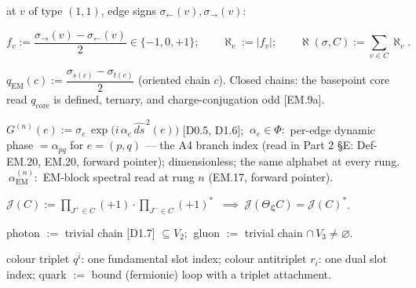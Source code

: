 \begin{definition}[{\texorpdfstring{D3.3}{D3.3}}]\label{tag:D3-3}
at $v$ of type $(1,1)$, edge signs $\sigma_{\leftarrow}(v),\sigma_{\rightarrow}(v)$:

\[
f_v:=\frac{\sigma_{\rightarrow}(v)-\sigma_{\leftarrow}(v)}{2}\in\{-1,0,+1\};\qquad
\aleph_v:=|f_v|;\qquad
\aleph(\sigma,C):=\sum_{v\in C}\aleph_v .
\]

\end{definition}

\begin{definition}[{\texorpdfstring{D3.4}{D3.4}}]\label{tag:D3-4}
$q_{\mathrm{EM}}(c):=\dfrac{\sigma_{s(c)}-\sigma_{t(c)}}{2}$ (oriented chain $c$). Closed chains: the basepoint core read $q_{\mathrm{core}}$ is defined, ternary, and charge-conjugation odd [EM.9a].

\end{definition}

\begin{definition}[{\texorpdfstring{D3.5}{D3.5}}]\label{tag:D3-5}
$G^{(n)}(e):=\sigma_e\,\exp\!\bigl(i\,\alpha_e\,\widehat{ds}^{\,2}(e)\bigr)$ [D0.5, D1.6]; $\ \alpha_e\in\Phi:$ per-edge dynamic phase $=\alpha_{pq}$ for $e=(p,q)$ — the A4 branch index (read in Part 2 §E: Def-EM.20, EM.20, forward pointer); dimensionless; the same alphabet at every rung. $\ \alpha_{\mathrm{EM}}^{(n)}:$ EM-block spectral read at rung $n$ (EM.17, forward pointer).

\end{definition}

\begin{definition}[{\texorpdfstring{D3.6}{D3.6}}]\label{tag:D3-6}
$\mathcal J(C):=\prod_{J^+\in C}(+1)\cdot\prod_{J^-\in C}(+1)^\ast$ $\ \implies\ \mathcal J(\Theta_{\mathfrak L}C)=\mathcal J(C)^\ast$.

\end{definition}

\begin{definition}[{\texorpdfstring{D3.7}{D3.7}}]\label{tag:D3-7}
photon $:=$ trivial chain [D1.7] $\subseteq V_2$; $\ $gluon $:=$ trivial chain $\cap\,V_3\ne\varnothing$.

\end{definition}

\begin{definition}[{\texorpdfstring{D3.8}{D3.8}}]\label{tag:D3-8}
colour triplet $q^i$: one fundamental slot index; colour antitriplet $r_i$: one dual slot index; quark $:=$ bound (fermionic) loop with a triplet attachment.

\end{definition}

